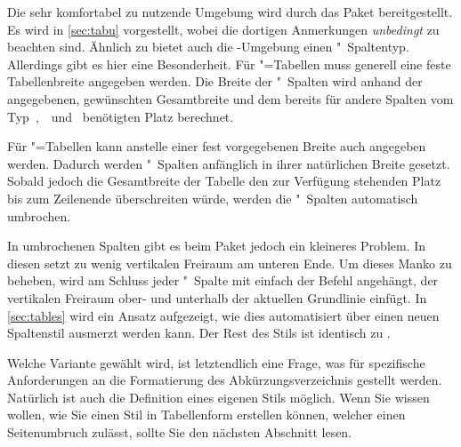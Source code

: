 \documentclass[%
  english,ngerman,%
  cdgeometry=no,DIV=12,automark,%
]{tudscrartcl}
\begin{document}
Die sehr komfortabel zu nutzende Umgebung  wird durch das 
Paket  bereitgestellt. Es wird in \autoref{sec:tabu} vorgestellt, 
wobei die dortigen Anmerkungen \emph{unbedingt} zu beachten sind. Ähnlich zu 
 bietet auch die -Umgebung einen 
"~Spaltentyp. Allerdings gibt es hier eine Besonderheit. Für 
"=Tabellen muss generell eine feste Tabellenbreite 
angegeben werden. Die Breite der "~Spalten wird anhand der 
angegebenen, gewünschten Gesamtbreite und dem bereits für andere Spalten vom 
Typ~,~~und~ benötigten Platz berechnet. 

Für "=Tabellen kann anstelle einer fest vorgegebenen Breite 
auch  angegeben werden. Dadurch werden "~Spalten 
anfänglich in ihrer natürlichen Breite gesetzt. Sobald jedoch die Gesamtbreite 
der Tabelle den zur Verfügung stehenden Platz bis zum Zeilenende überschreiten 
würde, werden die "~Spalten automatisch umbrochen. 

In umbrochenen Spalten gibt es beim Paket  jedoch ein kleineres 
Problem. In diesen setzt  zu wenig vertikalen Freiraum am unteren 
Ende. Um dieses Manko zu beheben, wird am Schluss jeder "~Spalte mit 
 einfach der Befehl  
angehängt, der vertikalen Freiraum ober- und unterhalb der aktuellen Grundlinie 
einfügt. In \autoref{sec:tables} wird ein Ansatz aufgezeigt, wie dies 
automatisiert über einen neuen Spaltenstil ausmerzt werden kann. Der Rest des 
Stils ist identisch zu .
%
\CodeHook{\let\newglossarystyle\renewglossarystyle}
\begin{Preamble*}

\end{Preamble*}
\begin{Hint}
\printacronyms[style=acrotabu]
\end{Hint}
\begin{quoting}[rightmargin=0pt]
\glsdisablehyper
\vspace*{-\baselineskipglue}
\InputCode
\end{quoting}
%
Welche Variante gewählt wird, ist letztendlich eine Frage, was für spezifische 
Anforderungen an die Formatierung des Abkürzungsverzeichnis gestellt werden. 
Natürlich ist auch die Definition eines eigenen Stils möglich. Wenn Sie wissen 
wollen, wie Sie einen Stil in Tabellenform erstellen können, welcher einen 
Seitenumbruch zulässt, sollte Sie den nächsten Abschnitt lesen.
\end{document}
